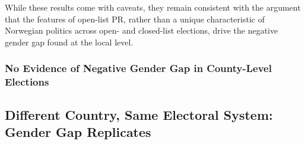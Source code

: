 \documentclass[12pt]{article}
\begin{document}
While these results come with caveats, they remain consistent with the argument that the features of open-list PR, rather than a unique characteristic of Norwegian politics across open- and closed-list elections, drive the negative gender gap found at the local level.


\clearpage
\subsubsection{No Evidence of Negative Gender Gap in County-Level Elections}
\label{app:norway_elex_nat}



\subsection{Different Country, Same Electoral System: Gender Gap Replicates}
\label{app:poland}
\end{document}
